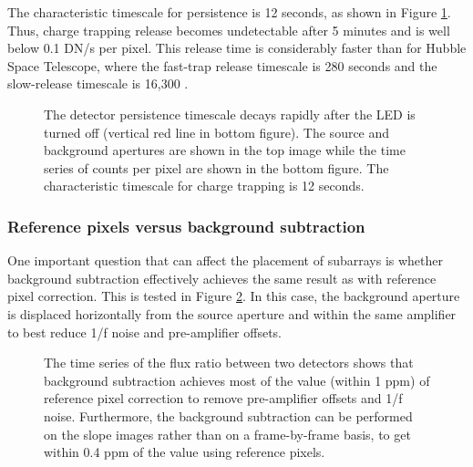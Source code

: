 \documentclass{aastex62}
\begin{document}
{The characteristic timescale for persistence is 12 seconds, as shown in Figure \ref{fig:persistence}.
Thus, charge trapping release becomes undetectable after 5 minutes and is well below 0.1 DN/s per pixel.
This release time is considerably faster than for Hubble Space Telescope, where the fast-trap release timescale is 280 seconds and the slow-release timescale is 16,300 \citep{zhou2017chargeTrap}.


\begin{figure}
{}
{}
\caption{The detector persistence timescale decays rapidly after the LED is turned off (vertical red line in bottom figure).
The source and background apertures are shown in the top image while the time series of counts per pixel are shown in the bottom figure.
The characteristic timescale for charge trapping is 12 seconds.}\label{fig:persistence}
\end{figure}


\clearpage
\subsubsection{Reference pixels versus background subtraction}
One important question that can affect the placement of subarrays is whether background subtraction effectively achieves the same result as with reference pixel correction.
This is tested in Figure \ref{fig:BackgVsRefpix}.
In this case, the background aperture is displaced horizontally from the source aperture and within the same amplifier to best reduce 1/f noise and pre-amplifier offsets.


\begin{figure}
{}
{}
{}
\caption{The time series of the flux ratio between two detectors shows that background subtraction achieves most of the value (within 1 ppm) of reference pixel correction to remove pre-amplifier offsets and 1/f noise.
Furthermore, the background subtraction can be performed on the slope images rather than on a frame-by-frame basis, to get within 0.4 ppm of the value using reference pixels.
}\label{fig:BackgVsRefpix}
\end{figure}

}
\end{document}
